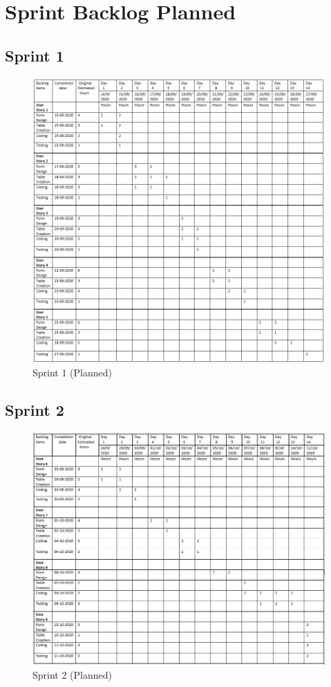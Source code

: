 \documentclass[a4paper,12pt]{report}
\begin{document}
\section{Sprint Backlog Planned}
\subsection {Sprint 1}
\begin{figure}[bph]
	\centering
	\includegraphics[width=1\linewidth]{img/sprint/sp1PLN}
	\caption{Sprint 1 (Planned)}
\end{figure}
\pagebreak
\subsection {Sprint 2}
\begin{figure}[bph]
	\centering
	\includegraphics[width=1\linewidth]{img/sprint/SSPRINT2PLAN}
	\caption{Sprint 2 (Planned)}
\end{figure}
\pagebreak
\end{document}
